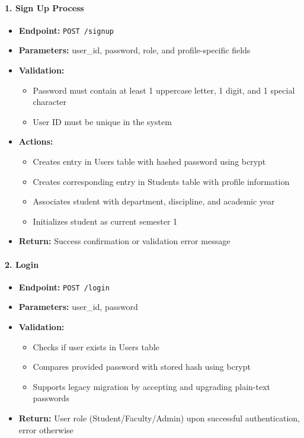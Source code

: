\documentclass[12pt]{article}
\begin{document}
\paragraph{1. Sign Up Process}
\begin{itemize}
    \item \textbf{Endpoint:} \texttt{POST /signup}
    \item \textbf{Parameters:} user\_id, password, role, and profile-specific fields
    \item \textbf{Validation:} 
        \begin{itemize}
            \item Password must contain at least 1 uppercase letter, 1 digit, and 1 special character
            \item User ID must be unique in the system
        \end{itemize}
    \item \textbf{Actions:}
        \begin{itemize}
            \item Creates entry in Users table with hashed password using bcrypt
            \item Creates corresponding entry in Students table with profile information
            \item Associates student with department, discipline, and academic year
            \item Initializes student as current semester 1
        \end{itemize}
    \item \textbf{Return:} Success confirmation or validation error message
\end{itemize}

\paragraph{2. Login}
\begin{itemize}
    \item \textbf{Endpoint:} \texttt{POST /login}
    \item \textbf{Parameters:} user\_id, password
    \item \textbf{Validation:}
        \begin{itemize}
            \item Checks if user exists in Users table
            \item Compares provided password with stored hash using bcrypt
            \item Supports legacy migration by accepting and upgrading plain-text passwords
        \end{itemize}
    \item \textbf{Return:} User role (Student/Faculty/Admin) upon successful authentication, error otherwise
\end{itemize}
\end{document}
